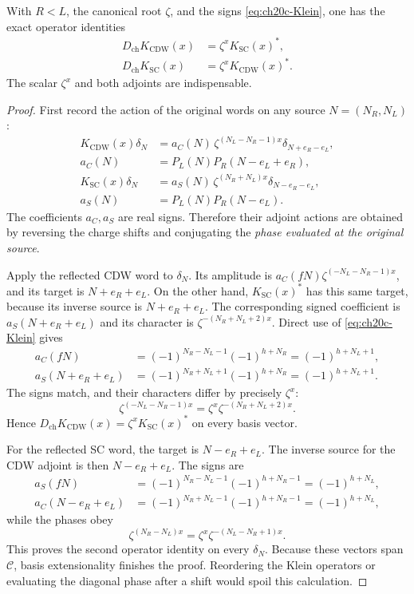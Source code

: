 \begin{proposition}
\label{prop:ch20c-Ktransform}
With $R<L$, the canonical root $\zeta$, and the signs
\eqref{eq:ch20c-Klein}, one has the exact operator identities
\begin{align}
 D_{\mathrm{ch}}K_{\mathrm{CDW}}(x)
 &=\zeta^x K_{\mathrm{SC}}(x)^*,\nonumber\\
 D_{\mathrm{ch}}K_{\mathrm{SC}}(x)
 &=\zeta^x K_{\mathrm{CDW}}(x)^*.
 \label{eq:ch20c-Kdual}
\end{align}
The scalar $\zeta^x$ and both adjoints are indispensable.
\end{proposition}
\begin{proof}
First record the action of the original words on any source
$N=(N_R,N_L)$:
\begin{align}
 K_{\mathrm{CDW}}(x)\delta_N
 &=a_C(N)\,\zeta^{(N_L-N_R-1)x}
       \delta_{N+e_R-e_L},\nonumber\\
 a_C(N)&=P_L(N)P_R(N-e_L+e_R),
 \label{eq:ch20c-actionC}\\
 K_{\mathrm{SC}}(x)\delta_N
 &=a_S(N)\,\zeta^{(N_R+N_L)x}
       \delta_{N-e_R-e_L},\nonumber\\
 a_S(N)&=P_L(N)P_R(N-e_L).
 \label{eq:ch20c-actionS}
\end{align}
The coefficients $a_C,a_S$ are real signs.  Therefore their
adjoint actions are obtained by reversing the charge shifts and
conjugating the \emph{phase evaluated at the original source}.

Apply the reflected CDW word to $\delta_N$.  Its amplitude is
$a_C(fN)\zeta^{(-N_L-N_R-1)x}$, and its target is
$N+e_R+e_L$.  On the other hand, $K_{\mathrm{SC}}(x)^*$ has
this same target, because its inverse source is
$N+e_R+e_L$.  The corresponding signed coefficient is
$a_S(N+e_R+e_L)$ and its character is
$\zeta^{-(N_R+N_L+2)x}$.  Direct use of
\eqref{eq:ch20c-Klein} gives
\begin{align*}
 a_C(fN)
 &=(-1)^{N_R-N_L-1}(-1)^{h+N_R}
 =(-1)^{h+N_L+1},\\
 a_S(N+e_R+e_L)
 &=(-1)^{N_R+N_L+1}(-1)^{h+N_R}
 =(-1)^{h+N_L+1}.
\end{align*}
The signs match, and their characters differ by precisely
$\zeta^x$:
\[
 \zeta^{(-N_L-N_R-1)x}
 =\zeta^x\zeta^{-(N_R+N_L+2)x}.
\]
Hence $D_{\mathrm{ch}}K_{\mathrm{CDW}}(x)
=\zeta^xK_{\mathrm{SC}}(x)^*$ on every basis vector.

For the reflected SC word, the target is $N-e_R+e_L$.
The inverse source for the CDW adjoint is then $N-e_R+e_L$.
The signs are
\begin{align*}
 a_S(fN)&=(-1)^{N_R-N_L-1}(-1)^{h+N_R-1}
 =(-1)^{h+N_L},\\
 a_C(N-e_R+e_L)
 &=(-1)^{N_R+N_L-1}(-1)^{h+N_R-1}
 =(-1)^{h+N_L},
\end{align*}
while the phases obey
\[
 \zeta^{(N_R-N_L)x}
 =\zeta^x\zeta^{-(N_L-N_R+1)x}.
\]
This proves the second operator identity on every $\delta_N$.
Because these vectors span $\mathcal C$, basis extensionality
finishes the proof.  Reordering the Klein operators or evaluating
the diagonal phase after a shift would spoil this calculation.
\end{proof}


